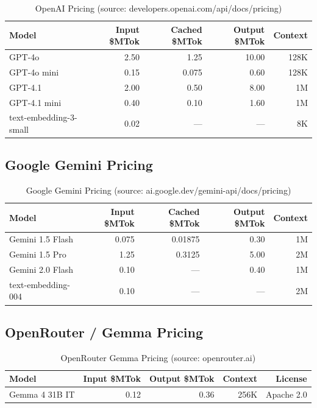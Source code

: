 \documentclass[11pt,a4paper]{article}
\begin{document}
\begin{table}[H]
\centering
\begin{tabular}{|l|r|r|r|r|}
\hline
\textbf{Model} & \textbf{Input \$MTok} & \textbf{Cached \$MTok} & \textbf{Output \$MTok} & \textbf{Context} \\
\hline
GPT-4o & 2.50 & 1.25 & 10.00 & 128K \\
\hline
GPT-4o mini & 0.15 & 0.075 & 0.60 & 128K \\
\hline
GPT-4.1 & 2.00 & 0.50 & 8.00 & 1M \\
\hline
GPT-4.1 mini & 0.40 & 0.10 & 1.60 & 1M \\
\hline
text-embedding-3-small & 0.02 & --- & --- & 8K \\
\hline
\end{tabular}
\caption{OpenAI Pricing (source: developers.openai.com/api/docs/pricing)}
\end{table}

\subsection{Google Gemini Pricing}

\begin{table}[H]
\centering
\begin{tabular}{|l|r|r|r|r|}
\hline
\textbf{Model} & \textbf{Input \$MTok} & \textbf{Cached \$MTok} & \textbf{Output \$MTok} & \textbf{Context} \\
\hline
Gemini 1.5 Flash & 0.075 & 0.01875 & 0.30 & 1M \\
\hline
Gemini 1.5 Pro & 1.25 & 0.3125 & 5.00 & 2M \\
\hline
Gemini 2.0 Flash & 0.10 & --- & 0.40 & 1M \\
\hline
text-embedding-004 & 0.10 & --- & --- & 2M \\
\hline
\end{tabular}
\caption{Google Gemini Pricing (source: ai.google.dev/gemini-api/docs/pricing)}
\end{table}

\subsection{OpenRouter / Gemma Pricing}

\begin{table}[H]
\centering
\begin{tabular}{|l|r|r|r|r|}
\hline
\textbf{Model} & \textbf{Input \$MTok} & \textbf{Output \$MTok} & \textbf{Context} & \textbf{License} \\
\hline
Gemma 4 31B IT & 0.12 & 0.36 & 256K & Apache 2.0 \\
\hline
\end{tabular}
\caption{OpenRouter Gemma Pricing (source: openrouter.ai)}
\end{table}
\end{document}
